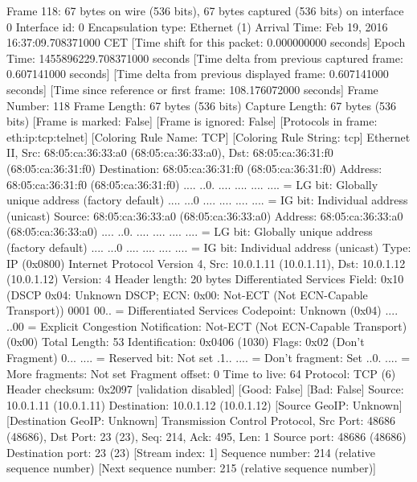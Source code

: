 Frame 118: 67 bytes on wire (536 bits), 67 bytes captured (536 bits) on interface 0
    Interface id: 0
    Encapsulation type: Ethernet (1)
    Arrival Time: Feb 19, 2016 16:37:09.708371000 CET
    [Time shift for this packet: 0.000000000 seconds]
    Epoch Time: 1455896229.708371000 seconds
    [Time delta from previous captured frame: 0.607141000 seconds]
    [Time delta from previous displayed frame: 0.607141000 seconds]
    [Time since reference or first frame: 108.176072000 seconds]
    Frame Number: 118
    Frame Length: 67 bytes (536 bits)
    Capture Length: 67 bytes (536 bits)
    [Frame is marked: False]
    [Frame is ignored: False]
    [Protocols in frame: eth:ip:tcp:telnet]
    [Coloring Rule Name: TCP]
    [Coloring Rule String: tcp]
Ethernet II, Src: 68:05:ca:36:33:a0 (68:05:ca:36:33:a0), Dst: 68:05:ca:36:31:f0 (68:05:ca:36:31:f0)
    Destination: 68:05:ca:36:31:f0 (68:05:ca:36:31:f0)
        Address: 68:05:ca:36:31:f0 (68:05:ca:36:31:f0)
        .... ..0. .... .... .... .... = LG bit: Globally unique address (factory default)
        .... ...0 .... .... .... .... = IG bit: Individual address (unicast)
    Source: 68:05:ca:36:33:a0 (68:05:ca:36:33:a0)
        Address: 68:05:ca:36:33:a0 (68:05:ca:36:33:a0)
        .... ..0. .... .... .... .... = LG bit: Globally unique address (factory default)
        .... ...0 .... .... .... .... = IG bit: Individual address (unicast)
    Type: IP (0x0800)
Internet Protocol Version 4, Src: 10.0.1.11 (10.0.1.11), Dst: 10.0.1.12 (10.0.1.12)
    Version: 4
    Header length: 20 bytes
    Differentiated Services Field: 0x10 (DSCP 0x04: Unknown DSCP; ECN: 0x00: Not-ECT (Not ECN-Capable Transport))
        0001 00.. = Differentiated Services Codepoint: Unknown (0x04)
        .... ..00 = Explicit Congestion Notification: Not-ECT (Not ECN-Capable Transport) (0x00)
    Total Length: 53
    Identification: 0x0406 (1030)
    Flags: 0x02 (Don't Fragment)
        0... .... = Reserved bit: Not set
        .1.. .... = Don't fragment: Set
        ..0. .... = More fragments: Not set
    Fragment offset: 0
    Time to live: 64
    Protocol: TCP (6)
    Header checksum: 0x2097 [validation disabled]
        [Good: False]
        [Bad: False]
    Source: 10.0.1.11 (10.0.1.11)
    Destination: 10.0.1.12 (10.0.1.12)
    [Source GeoIP: Unknown]
    [Destination GeoIP: Unknown]
Transmission Control Protocol, Src Port: 48686 (48686), Dst Port: 23 (23), Seq: 214, Ack: 495, Len: 1
    Source port: 48686 (48686)
    Destination port: 23 (23)
    [Stream index: 1]
    Sequence number: 214    (relative sequence number)
    [Next sequence number: 215    (relative sequence number)]
